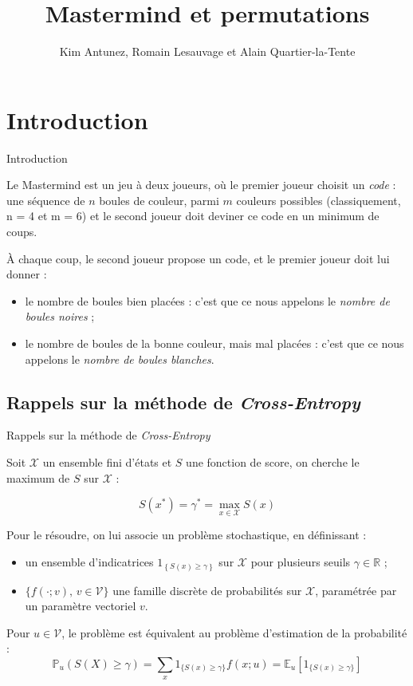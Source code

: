\documentclass[10pt,xcolor=table,color={dvipsnames,usenames},ignorenonframetext,usepdftitle=false,french]{beamer}
\title{Mastermind et permutations}
\author{Kim Antunez, Romain Lesauvage et Alain Quartier-la-Tente}
\date{}
\begin{document}
\begin{frame}
\titlepage
\end{frame}

\section{Introduction}\label{introduction}

\begin{frame}{Introduction}

Le Mastermind est un jeu à deux joueurs, où le premier joueur choisit un
\emph{code} : une séquence de \(n\) boules de couleur, parmi \(m\)
couleurs possibles (classiquement, n = 4 et m = 6) et le second joueur
doit deviner ce code en un minimum de coups.

À chaque coup, le second joueur propose un code, et le premier joueur
doit lui donner :

\begin{itemize}
\item le nombre de boules bien placées : c'est que ce nous appelons le \textit{nombre de boules noires} ;  
\item le nombre de boules de la bonne couleur, mais mal placées : c'est que ce nous appelons le \textit{nombre de boules blanches}.
\end{itemize}

\end{frame}

\subsection{\texorpdfstring{Rappels sur la méthode de
\emph{Cross-Entropy}}{Rappels sur la méthode de Cross-Entropy}}\label{rappels-sur-la-muxe9thode-de-cross-entropy}

\begin{frame}{Rappels sur la méthode de \emph{Cross-Entropy}}

Soit \(\mathcal{X}\) un ensemble fini d'états et \(S\) une fonction de
score, on cherche le maximum de \(S\) sur \(\mathcal{X}\) :

\begin{equation} 
S(x^{*})=\gamma^{*}=\underset{x\in\mathcal{X}}{{\max}} S(x)
\end{equation}

Pour le résoudre, on lui associe un problème stochastique, en
définissant :

\begin{itemize}
\item un ensemble d'indicatrices $1_{\left\{ S(x)\geq\gamma\right\}}$ sur $\mathcal{X}$ pour plusieurs seuils $\gamma\in\mathbb{R}$ ;  
\item $\{f(\cdot;v),\,v\in\mathcal{V}\}$ une famille discrète de probabilités sur $\mathcal{X}$, paramétrée par un paramètre vectoriel $v$. 
\end{itemize}

Pour \(u\in\mathcal{V}\), le problème est équivalent au problème
d'estimation de la probabilité :
\[\mathbb{P}_{u}(S(X)\geq\gamma)=\sum_{x}1_{\{S(x)\geq\gamma\}}f(x;u)=\mathbb{E}_{u}[1_{\{S(x)\geq\gamma\}}]\]

\end{frame}
\end{document}

